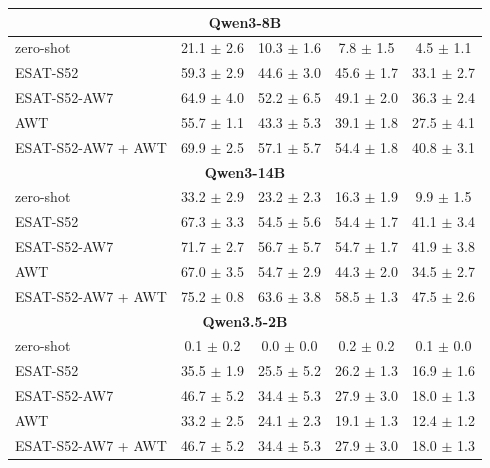 \begin{table}[H]
{\begin{tabular}[b]{lcccc}
\multicolumn{5}{c}{\bf Qwen3-8B}\\
\midrule
zero-shot                   & 21.1 $\pm$ 2.6 & 10.3 $\pm$ 1.6 & \phantom{0}7.8 $\pm$ 1.5 & 4.5 $\pm$ 1.1 \\
\textsc{ESAT-S52}           & 59.3 $\pm$ 2.9 & 44.6 $\pm$ 3.0 & 45.6 $\pm$ 1.7           & 33.1 $\pm$ 2.7 \\
\textsc{ESAT-S52-AW7}       & 64.9 $\pm$ 4.0 & 52.2 $\pm$ 6.5 & 49.1 $\pm$ 2.0           & 36.3 $\pm$ 2.4 \\
\midrule
\textsc{AWT}                & 55.7 $\pm$ 1.1 & 43.3 $\pm$ 5.3 & 39.1 $\pm$ 1.8 & 27.5 $\pm$ 4.1 \\
\textsc{ESAT-S52-AW7 + AWT} & 69.9 $\pm$ 2.5 & 57.1 $\pm$ 5.7 & 54.4 $\pm$ 1.8 & 40.8 $\pm$ 3.1 \\
\midrule

\multicolumn{5}{c}{\bf Qwen3-14B}\\
\midrule
zero-shot                   & 33.2 $\pm$ 2.9 & 23.2 $\pm$ 2.3 & 16.3 $\pm$ 1.9 & 9.9 $\pm$ 1.5 \\
\textsc{ESAT-S52}           & 67.3 $\pm$ 3.3 & 54.5 $\pm$ 5.6 & 54.4 $\pm$ 1.7 & 41.1 $\pm$ 3.4 \\
\textsc{ESAT-S52-AW7}       & 71.7 $\pm$ 2.7 & 56.7 $\pm$ 5.7 & 54.7 $\pm$ 1.7 & 41.9 $\pm$ 3.8 \\
\midrule
\textsc{AWT}                & 67.0 $\pm$ 3.5 & 54.7 $\pm$ 2.9 & 44.3 $\pm$ 2.0 & 34.5 $\pm$ 2.7 \\
\textsc{ESAT-S52-AW7 + AWT} & 75.2 $\pm$ 0.8 & 63.6 $\pm$ 3.8 & 58.5 $\pm$ 1.3 & 47.5 $\pm$ 2.6 \\
\midrule
\multicolumn{5}{c}{\bf Qwen3.5-2B}\\
\midrule
zero-shot                   & \phantom{0}0.1 $\pm$ 0.2 & 0.0 $\pm$ 0.0 & \phantom{0}0.2 $\pm$ 0.2 & 0.1 $\pm$ 0.0 \\
\textsc{ESAT-S52}           & 35.5 $\pm$ 1.9           & 25.5 $\pm$ 5.2 & 26.2 $\pm$ 1.3           & 16.9 $\pm$ 1.6 \\
\textsc{ESAT-S52-AW7}       & 46.7 $\pm$ 5.2           & 34.4 $\pm$ 5.3 & 27.9 $\pm$ 3.0           & 18.0 $\pm$ 1.3 \\
\midrule
\textsc{AWT}                & 33.2 $\pm$ 2.5 & 24.1 $\pm$ 2.3 & 19.1 $\pm$ 1.3 & 12.4 $\pm$ 1.2 \\
\textsc{ESAT-S52-AW7 + AWT} & 46.7 $\pm$ 5.2 & 34.4 $\pm$ 5.3 & 27.9 $\pm$ 3.0 & 18.0 $\pm$ 1.3 \\
\midrule


\end{tabular}}
\end{table}
